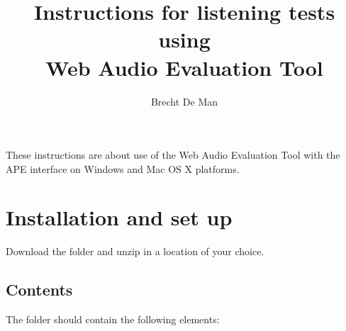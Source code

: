 \documentclass[11pt, oneside]{article}   	%
\title{Instructions for listening tests using\\ Web Audio Evaluation Tool}
\author{Brecht De Man}
\date{}							%
\begin{document}
\maketitle

These instructions are about use of the Web Audio Evaluation Tool \cite{deman2015c} with the APE interface \cite{deman2014b} on Windows and Mac OS X platforms. 

\tableofcontents



\section{Installation and set up}
	Download the folder and unzip in a location of your choice. 
	
	\subsection{Contents}
		The folder should contain the following elements: \\
		
\end{document}
